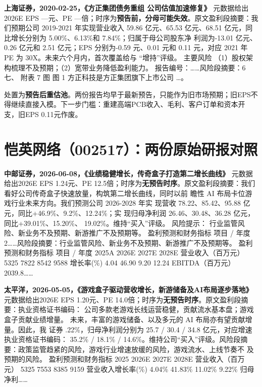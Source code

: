 \textbf{上海证券，2020-02-25，《方正集团债务重组 公司估值加速修复》}
元数据给出2026E EPS ---元、PE ---倍；时序为\textbf{预告前，分母可能失效}。原文盈利段摘要：我们预期公司 2019-2021 年实现营业收入 59.86 亿元、65.53 亿元、68.51 亿元，同比增长分别为 5.00\%、6.13\%和 7.84\%；归属于母公司股东净 利润为-13.01 亿元、0.26 亿元和 2.51 亿元；EPS 分别为-0.59 元、0.01 元和 0.11 元，对应 2021 年 PE 为 30X。未来六个月内，首次覆盖给与 “增持”评级。 主要风险 （1）股权架构梳理不及预期；（2）宽带业务降低盈利能力。 报告编号：……风险段摘要：6 七、 附表 7 图 图 1 方正科技是方正集团旗下上市公司 …。

\begin{keyinsight}[AStock处理]
处置为\textbf{预告后重估池}。两份报告均早于最新预告，只能作为旧市场预期；旧EPS不得继续直接入模。下一步门槛：重建高端PCB收入、毛利、客户订单和资本开支，旧EPS 0.11元作废。
\end{keyinsight}

\section{恺英网络（002517）：两份原始研报对照}

\textbf{中邮证券，2026-06-08，《业绩稳健增长，传奇盒子打造第二增长曲线》}
元数据给出2026E EPS 1.24元、PE 12.5倍；时序为\textbf{无预告时序}。原文盈利段摘要：我们看好公司传奇盒子快速放量，构筑第二增长曲线，同时以前 瞻性 AI 布局卡位游戏行业未来方向。我们预测公司 2026-2028 年实 现营收 78.22、85.42、95.88 亿元，同比+46.9\%、9.2\%、12.24\%；实 现归母净利润 26.46、30.48、36.28 亿元，同比+39.01\%、15.20\%、 19.02\%。维持“买入”评级。 风险提示： 行业监管风险、新业务不及预期、新游推广不及预期等。 盈利预测和财务指标 项目 / 年度 2……风险段摘要：行业监管风险、新业务不及预期、新游推广不及预期等。 盈利预测和财务指标 项目 / 年度 2025A 2026E 2027E 2028E 营业收入（百万元） 5325 7822 8542 9588 增长率(\%) 4.04 46.90 9.20 12.24 EBITDA（百万元） 2039.8……

\textbf{太平洋，2026-05-05，《游戏盒子驱动营收增长，新游储备及AI布局逐步落地》}
元数据给出2026E EPS 1.20元、PE 14.0倍；时序为\textbf{无预告时序}。原文盈利段摘要：执业资格证书编码： 公司多款老游戏长线运营稳健，贡献流水基本盘；游戏盒子贡献业绩增量。 未来，丰富的游戏储备、以及多元的 AI 布局亦有望贡献增量。因此，我 证券 .22\%，归母净利润分别为 25.7 / 30.4 / 34.8 亿元，对应增速 执业资格证书编码： 35.2\% / 18.1\% / 14.6\%。维持公司“买入”评级。风险段摘要：政策监管趋紧的风险，游戏行业增速放缓的风险，游戏流水、上线节奏不 及预期的风险。 盈利预测和财务指标 2025 2026E 2027E 2028E 营业收入（百万元） 5325 7553 8385 9159 营业收入增长率(\%) 4.04\% 41.83\% 11.02\% 9.22\% 归母净利……

